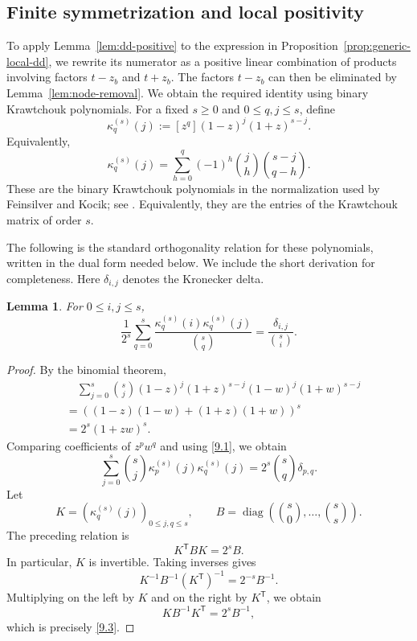 \documentclass[10pt,a4paper]{amsart}
\newtheorem{Lemma}[Theorem]{Lemma}
\theoremstyle{definition}
\begin{document}
\subsection{Finite symmetrization and local positivity}\label{sec:local-positive}

To apply Lemma~\ref{lem:dd-positive} to the expression in
Proposition~\ref{prop:generic-local-dd}, we rewrite its numerator as
a positive linear combination of products involving factors
$t-z_b$ and $t+z_b$.
The factors $t-z_b$ can then be eliminated by
Lemma~\ref{lem:node-removal}.
We obtain the required identity using binary Krawtchouk polynomials. For a fixed $s\ge0$
and $0\le q,j\le s$, define
\begin{equation}\label{9.1}
\kappa_q^{(s)}(j)
:=[z^q](1-z)^j(1+z)^{s-j}.
\end{equation}
Equivalently,
\begin{equation}\label{9.2}
\kappa_q^{(s)}(j)
=
\sum_{h=0}^q
(-1)^h\binom{j}{h}\binom{s-j}{q-h}.
\end{equation}
These are the binary Krawtchouk polynomials in the normalization used by
Feinsilver and Kocik; see \cite{FeinsilverKocik}.  Equivalently, they are
the entries of the Krawtchouk matrix of order $s$. 

The following is the standard orthogonality relation for these
polynomials, written in the dual form needed below.  We include the short
derivation for completeness.  Here $\delta_{i,j}$ denotes the Kronecker
delta.

\begin{Lemma}\label{lem:kappa-orthogonality} 
For $0\le i,j\le s$, 
\begin{equation}\label{9.3}
\frac{1}{2^s}
\sum_{q=0}^s 
\frac{\kappa_q^{(s)}(i)\kappa_q^{(s)}(j)} {\binom{s}{q}} = \frac{\delta_{i,j}}{\binom{s}{i}}. 
\end{equation} 
\end{Lemma}

\begin{proof}
By the binomial theorem,
\[
\begin{aligned}
 &\quad \sum_{j=0}^s\binom{s}{j}
(1-z)^j(1+z)^{s-j}
(1-w)^j(1+w)^{s-j}\\
& =
\left((1-z)(1-w)+(1+z)(1+w)\right)^s\\
& =
2^s(1+zw)^s.
\end{aligned}
\]
Comparing coefficients of $z^pw^q$ and using \eqref{9.1}, we obtain
\[ 
\sum_{j=0}^s
\binom{s}{j}
\kappa_p^{(s)}(j)\kappa_q^{(s)}(j)
=
2^s\binom{s}{q}\delta_{p,q}.
\]
Let
\[
K=(\kappa_q^{(s)}(j))_{0\le j,q\le s},
\qquad
B=\operatorname{diag}\!\left(
\binom{s}{0},\ldots,\binom{s}{s}
\right).
\]
The preceding relation is
\[
K^{\mathsf T}BK=2^sB.
\]
In particular, $K$ is invertible.  Taking inverses gives
\[
K^{-1}B^{-1}(K^{\mathsf T})^{-1}=2^{-s}B^{-1}.
\]
Multiplying on the left by $K$ and on the right by $K^{\mathsf T}$, we
obtain
\[
KB^{-1}K^{\mathsf T}=2^sB^{-1},
\]
which is precisely \eqref{9.3}.
\end{proof}
\end{document}
